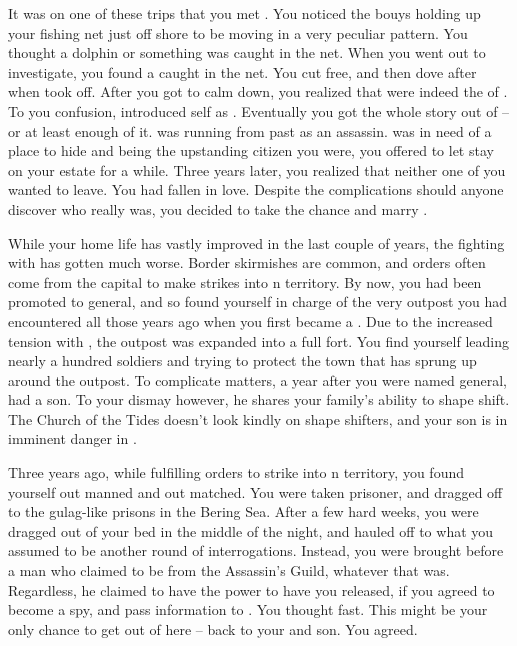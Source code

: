 \documentclass[char]{NeptuneBall}
\begin{document}
It was on one of these trips that you met \cQueen{}. You noticed the bouys holding up your fishing net just off shore to be moving in a very peculiar pattern. You thought a dolphin or something was caught in the net. When you went out to investigate, you found a \cQueen{\mer} caught in the net. You cut \cQueen{\them} free, and then dove after \cQueen{\them} when \cQueen{\they} took off. After you got \cQueen{} to calm down, you realized that \cQueen{\they} were indeed the \cQueen{\King} of \pAtlantis{}. To you confusion, \cQueen{\they} introduced \cQueen{\them}self as \cQueen{\MYname}. Eventually you got the whole story out of \cQueen{\them} -- or at least enough of it. \cQueen{} was running from \cQueen{\them} past as an assassin. \cQueen{} was in need of a place to hide and being the upstanding citizen you were, you offered to let \cQueen{\them} stay on your estate for a while.  Three years later, you realized that neither one of you wanted \cQueen{\them} to leave. You had fallen in love. Despite the complications should anyone discover who \cQueen{} really was, you decided to take the chance and marry \cQueen{\them}.

While your home life has vastly improved in the last couple of years, the fighting with \pPacifica{} has gotten much worse. Border skirmishes are common, and orders often come from the capital to make strikes into \pPacifica{}n territory. By now, you had been promoted to general, and so found yourself in charge of the very outpost you had encountered all those years ago when you first became a \cGeneral{\mer}. Due to the increased tension with \pPacifica{}, the outpost was expanded into a full fort. You find yourself leading nearly a hundred soldiers and trying to protect the town that has sprung up around the outpost. To complicate matters, a year after you were named general, \cQueen{} had a son. To your dismay however, he shares your family's ability to shape shift. The Church of the Tides doesn't look kindly on shape shifters, and your son is in imminent danger in \pAtlantis{}.

Three years ago, while fulfilling orders to strike into \pPacifica{}n territory, you found yourself out manned and out matched. You were taken prisoner, and dragged off to the gulag-like prisons in the Bering Sea. After a few hard weeks, you were dragged out of your bed in the middle of the night, and hauled off to what you assumed to be another round of interrogations. Instead, you were brought before a man who claimed to be from the Assassin's Guild, whatever that was. Regardless, he claimed to have the power to have you released, if you agreed to become a spy, and pass information to \pPacifica{}. You thought fast. This might be your only chance to get out of here -- back to your \cQueen{\spouse} and son. You agreed.
\end{document}
